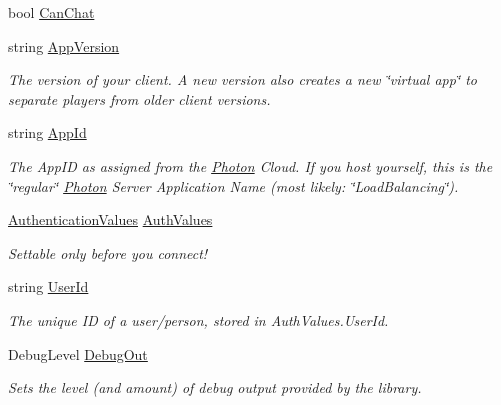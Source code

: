 \begin{DoxyCompactItemize}
\item 
bool \hyperlink{class_exit_games_1_1_client_1_1_photon_1_1_chat_1_1_chat_client_a71c10e565150962413bb1abaa89af66a}{Can\+Chat}
\item 
string \hyperlink{class_exit_games_1_1_client_1_1_photon_1_1_chat_1_1_chat_client_a96bec51384215e8622397b8fe2fc90e1}{App\+Version}
\begin{DoxyCompactList}\small\item\em The version of your client. A new version also creates a new \char`\"{}virtual app\char`\"{} to separate players from older client versions.\end{DoxyCompactList}\item 
string \hyperlink{class_exit_games_1_1_client_1_1_photon_1_1_chat_1_1_chat_client_a876c9a53400fe18fc365775ca728928f}{App\+Id}
\begin{DoxyCompactList}\small\item\em The App\+ID as assigned from the \hyperlink{namespace_exit_games_1_1_client_1_1_photon}{Photon} Cloud. If you host yourself, this is the \char`\"{}regular\char`\"{} \hyperlink{namespace_exit_games_1_1_client_1_1_photon}{Photon} Server Application Name (most likely\+: \char`\"{}\+Load\+Balancing\char`\"{}).\end{DoxyCompactList}\item 
\hyperlink{class_exit_games_1_1_client_1_1_photon_1_1_chat_1_1_authentication_values}{Authentication\+Values} \hyperlink{class_exit_games_1_1_client_1_1_photon_1_1_chat_1_1_chat_client_a5c03b22e8271f95ee0b46ebbd2bac651}{Auth\+Values}
\begin{DoxyCompactList}\small\item\em Settable only before you connect!\end{DoxyCompactList}\item 
string \hyperlink{class_exit_games_1_1_client_1_1_photon_1_1_chat_1_1_chat_client_a8f757bc4e9f4038dc388a8fee3f47150}{User\+Id}
\begin{DoxyCompactList}\small\item\em The unique ID of a user/person, stored in Auth\+Values.\+User\+Id. \end{DoxyCompactList}\item 
Debug\+Level \hyperlink{class_exit_games_1_1_client_1_1_photon_1_1_chat_1_1_chat_client_a3506656c033fb2bdc7822275aab6dac2}{Debug\+Out}
\begin{DoxyCompactList}\small\item\em Sets the level (and amount) of debug output provided by the library. \end{DoxyCompactList}\end{DoxyCompactItemize}


